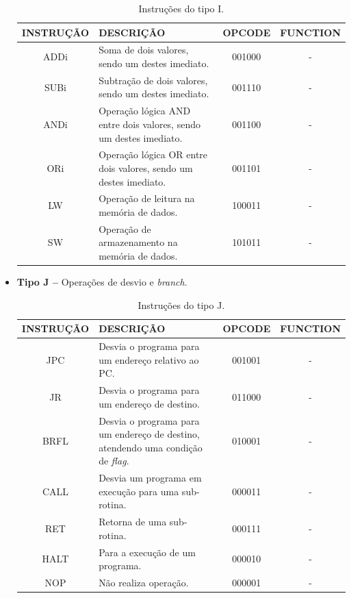 \documentclass{report}
\begin{document}
\begin{itemize}
	\begin{table}[H]
	\centering
	\begin{tabular}{|c|m{6cm}|c|c|}
  	\hline 
  	\textbf{INSTRUÇÃO} & \textbf{DESCRIÇÃO} & \textbf{OPCODE} & \textbf{FUNCTION} \\ 
  	\hline 
  	ADDi & Soma de dois valores, sendo um destes imediato. & 001000 & - \\ \hline
  	SUBi & Subtração de dois valores, sendo um destes imediato. & 001110 & - \\ \hline
  	ANDi & Operação lógica AND entre dois valores, sendo um destes imediato. & 001100 & - \\ \hline
  	ORi  & Operação lógica OR entre dois valores, sendo um destes imediato. & 001101 & - \\ \hline
    LW   & Operação de leitura na memória de dados. & 100011 & - \\ \hline
    SW   & Operação de armazenamento na memória de dados. & 101011 & - \\ \hline
  	\end{tabular} 
  	\caption{Instruções do tipo I.}
  \end{table}
    
    \item \textbf{Tipo J --} Operações de desvio e \textit{branch}.
    
	\begin{table}[H]
	\centering
	\begin{tabular}{|c|m{6cm}|c|c|}
  	\hline 
  	\textbf{INSTRUÇÃO} & \textbf{DESCRIÇÃO} & \textbf{OPCODE} & \textbf{FUNCTION} \\ 
  	\hline 
  	JPC  & Desvia o programa para um endereço relativo ao PC. & 001001 & - \\ \hline
    JR   & Desvia o programa para um endereço de destino. & 011000 & - \\ \hline
  	BRFL & Desvia o programa para um endereço de destino, atendendo uma condição de \textit{flag}. & 010001 & - \\ \hline
  	CALL & Desvia um programa em execução para uma sub-rotina. & 000011 & - \\ \hline
  	RET  & Retorna de uma sub-rotina. & 000111 & - \\ \hline
  	HALT & Para a execução de um programa. & 000010 & - \\ \hline
  	NOP  & Não realiza operação. & 000001 & - \\ \hline
  	\end{tabular} 
  	\caption{Instruções do tipo J.}
  \end{table}
    
    \end{itemize}
\end{document}
